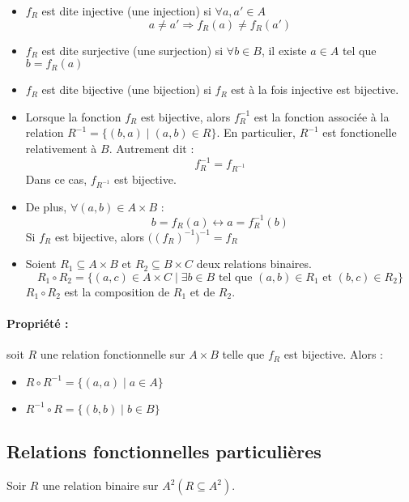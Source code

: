 \documentclass[12pt, a4paper]{report}
\begin{document}
\begin{itemize}
\item $f_R$ est dite injective (une injection) si $\forall a, a' \in
  A$
\[a\neq a' \Rightarrow f_R(a) \neq f_R(a')\]

\item $f_R$ est dite surjective (une surjection) si $\forall b\in B$,
  il existe $a\in A$ tel que $b = f_R(a)$

\item $f_R$ est dite bijective (une bijection) si $f_R$ est à la fois
  injective est bijective.

\item Lorsque la fonction $f_R$ est bijective, alors $f_R^{-1}$ est la
  fonction associée à la relation $R^{-1} = \{(b,a) \mid (a,b) \in
  R\}$. En particulier, $R^{-1}$ est fonctionelle relativement à
  $B$. Autrement dit :
\[f_R^{-1} = f_{R^{-1}}\]
Dans ce cas, $f_{R^{-1}}$ est bijective.

\item De plus, $\forall (a, b) \in A\times B$ : 
\[b=f_R(a) \leftrightarrow a = f_R^{-1}(b)\]
Si $f_R$ est bijective, alors $\big((f_R)^{-1}\big)^{-1} = f_R$

\item Soient $R_1 \subseteq A\times B$ et $R_2 \subseteq B\times C$
  deux relations binaires.
\[R_1 \circ R_2 = \{(a,c) \in A \times C \mid \exists b\in B \text{ tel que }(a,b)\in R_1 \text{ et } (b,c)\in R_2\} \]
$R_1 \circ R_2$ est la composition de $R_1$ et de $R_2$.
\end{itemize}

\paragraph{Propriété :} soit $R$ une relation fonctionnelle sur $A\times B$ telle que $f_R$ est bijective. Alors :

\begin{itemize}
\item $R\circ R^{-1} = \{(a,a)\mid a\in A\}$
\item $R^{-1}\circ R = \{(b,b)\mid b\in B\}$
\end{itemize}

\subsection{Relations fonctionnelles particulières}
Soir $R$ une relation binaire sur $A^2 (R\subseteq A^2)$.
\end{document}
